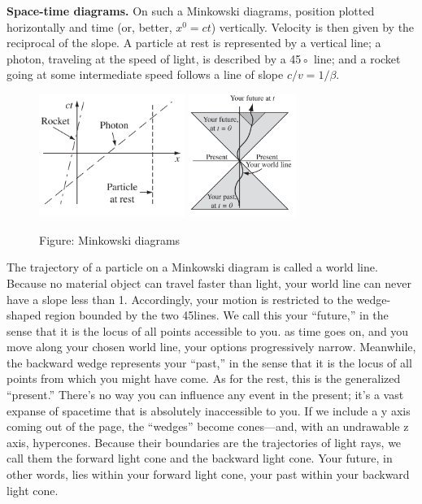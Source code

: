 \documentclass[../main.tex]{subfiles}
\begin{document}
\textbf{Space-time diagrams.} On such a Minkowski diagrams, position plotted horizontally and time (or, better, $x^0 = ct$) vertically. Velocity is then given by the reciprocal of the slope. A particle at rest is represented by a vertical line; a photon, traveling at the speed of light, is described by a 45◦ line; and a rocket going at some intermediate speed follows a line of slope $c/v = 1/\beta$.
\begin{figure}
    \centering
    \includegraphics[height=4cm]{../Rss/Relativity/MinkowskiDig.png}
    \includegraphics[height=4cm]{../Rss/Relativity/WorldLine.png}
    \caption*{Figure: Minkowski diagrams}
\end{figure}

The trajectory of a particle on a Minkowski diagram is called a world line. Because no material object can travel faster than light, your world line can never have a slope less than 1. Accordingly, your motion is restricted to the wedge-shaped region bounded by the two 45\textdegree lines. We call this your “future,” in the sense that it is the locus of all points accessible to you. as time goes on, and you move along your chosen world line, your options progressively narrow. Meanwhile, the backward wedge represents your “past,” in the sense that it is the locus of all points from which you might have come. As for the rest, this is the generalized “present.” There's no way you can influence any event in the present; it's a vast expanse of spacetime that is absolutely inaccessible to you. If we include a y axis coming out of the page, the “wedges” become cones—and, with an undrawable z axis, hypercones. Because their boundaries are the trajectories of light rays, we call them the forward light cone and the backward light cone. Your future, in other words, lies within your forward light cone, your past within your backward light cone.
\end{document}

